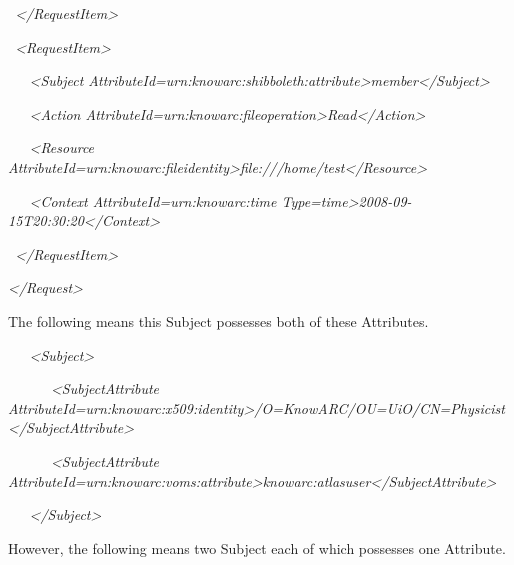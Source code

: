 \documentclass[a4paper]{article}
\begin{document}
{\itshape\color{black}
\ {\textless}/RequestItem{\textgreater}}

{\itshape\color{black}
\ {\textless}RequestItem{\textgreater}}

{\itshape\color{black}
\ \ \ {\textless}Subject
AttributeId={\textquotedbl}urn:knowarc:shibboleth:attribute{\textquotedbl}{\textgreater}member{\textless}/Subject{\textgreater}}

{\itshape\color{black}
\ \ \ {\textless}Action
AttributeId={\textquotedbl}urn:knowarc:fileoperation{\textquotedbl}{\textgreater}Read{\textless}/Action{\textgreater}}

{\itshape\color{black}
\ \ \ {\textless}Resource
AttributeId={\textquotedbl}urn:knowarc:fileidentity{\textgreater}file:///home/test{\textless}/Resource{\textgreater}}

{\itshape\color{black}
\ \ \ {\textless}Context
AttributeId={\textquotedbl}urn:knowarc:time{\textquotedbl}
Type={\textquotedbl}time{\textquotedbl}{\textgreater}2008-09-15T20:30:20{\textless}/Context{\textgreater}}

{\itshape\color{black}
\ {\textless}/RequestItem{\textgreater}}

{\itshape\color{black}
{\textless}/Request{\textgreater}}

{\color{black}
The following means this Subject possesses both of these Attributes.}

{\itshape\color{black}
\ \ \ {\textless}Subject{\textgreater}}

{\itshape\color{black}
\ \ \ \ \ \ {\textless}SubjectAttribute
AttributeId={\textquotedbl}urn:knowarc:x509:identity{\textquotedbl}{\textgreater}/O=KnowARC/OU=UiO/CN=Physicist{\textless}/SubjectAttribute{\textgreater}}

{\itshape\color{black}
\ \ \ \ \ \ {\textless}SubjectAttribute
AttributeId={\textquotedbl}urn:knowarc:voms:attribute{\textgreater}knowarc:atlasuser{\textless}/SubjectAttribute{\textgreater}}

{\itshape\color{black}
\ \ \ {\textless}/Subject{\textgreater}}

{\color{black}
However, the following means two Subject each of which possesses one
Attribute.}
\end{document}
